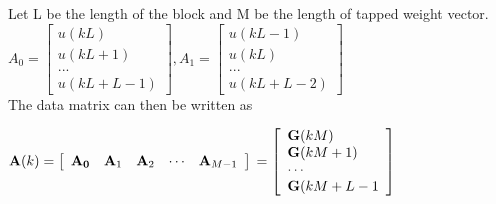 \documentclass[conference]{IEEEtran}
\begin{document}
Let L be the length of the block and M be the length of tapped weight vector.\\
$A_0 = \begin{bmatrix}
u(kL)\\ u(kL+1)
\\ ...
\\ u(kL + L-1)
\end{bmatrix}, A_1 = \begin{bmatrix}
u(kL-1)\\ u(kL)
\\ ...
\\ u(kL + L-2)

\end{bmatrix}$\\

The data matrix can then be written as
\begin{center}
$\mathbf{A}(k)=\left[ \begin{array}{lllll}{\mathbf{A}_{\mathbf{0}}} & {\mathbf{A}_{1}} & {\mathbf{A}_{2}} & {\cdots} & {\mathbf{A}_{M-1}}\end{array}\right]\\ = \left[ \begin{array}{l}{\mathbf{G}(k M)} \\ {\mathbf{G}(k M+1)} \\ {\cdots} \\ {\mathbf{G}(k M+L-1}\end{array}\right]$
 \end{center}
\end{document}
